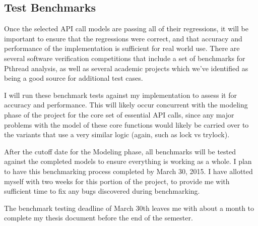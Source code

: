 \documentclass{scrartcl}
\begin{document}
\subsection{Test Benchmarks}
Once the selected API call models are passing all of their regressions, it will be important to ensure that the regressions were correct, and that accuracy and performance of the implementation is sufficient for real world use.  There are several software verification competitions that include a set of benchmarks for Pthread analysis, as well as several academic projects which we've identified as being a good source for additional test cases.

I will run these benchmark tests against my implementation to assess it for accuracy and performance.  This will likely occur concurrent with the modeling phase of the project for the core set of essential API calls, since any major problems with the model of these core functions would likely be carried over to the variants that use a very similar logic (again, such as lock vs trylock).

After the cutoff date for the Modeling phase, all benchmarks will be tested against the completed models to ensure everything is working as a whole.  I plan to have this benchmarking process completed by March 30, 2015.  I have allotted myself with two weeks for this portion of the project, to provide me with sufficient time to fix any bugs discovered during benchmarking.  

The benchmark testing deadline of March 30th leaves me with about a month to complete my thesis document before the end of the semester.





\end{document}
